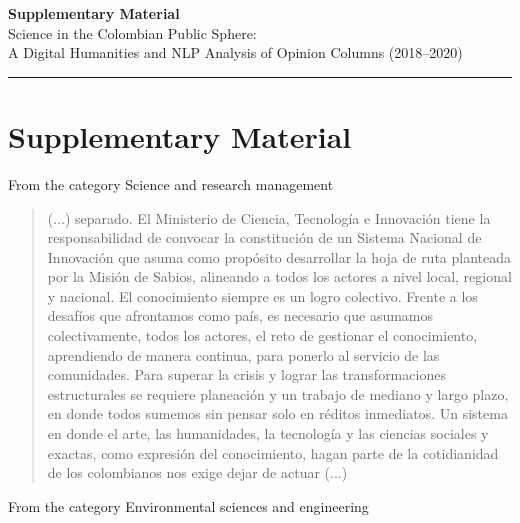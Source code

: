 \documentclass[12pt]{article}
\begin{document}
	
	\begin{center}
		{\LARGE \textbf{Supplementary Material}}\\[0.5em]
		{\large Science in the Colombian Public Sphere:  \\
			A Digital Humanities and NLP Analysis of Opinion Columns (2018–2020)}
	\end{center}
	
	\vspace{1em}
	\hrule
	\vspace{1em}
	


	\section*{Supplementary Material}

	
	From the category Science and research management
	
	\begin{quote}
		(...) separado. El Ministerio de Ciencia, Tecnología e Innovación tiene la responsabilidad de convocar la constitución de un Sistema Nacional de Innovación que asuma como propósito desarrollar la hoja de ruta planteada por la Misión de Sabios, alineando a todos los actores a nivel local, regional y nacional. El conocimiento siempre es un logro colectivo. Frente a los desafíos que afrontamos como país, es necesario que asumamos colectivamente, todos los actores, el reto de gestionar el conocimiento, aprendiendo de manera continua, para ponerlo al servicio de las comunidades. Para superar la crisis y lograr las transformaciones estructurales se requiere planeación y un trabajo de mediano y largo plazo, en donde todos sumemos sin pensar solo en réditos inmediatos. Un sistema en donde el arte, las humanidades, la tecnología y las ciencias sociales y exactas, como expresión del conocimiento, hagan parte de la cotidianidad de los colombianos nos exige dejar de actuar (...)
		
	\end{quote}
	
	From the category Environmental sciences and engineering
	
\end{document}
